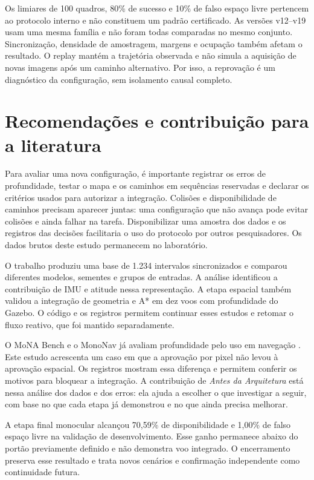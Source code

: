 Os limiares de 100 quadros, 80\% de sucesso e 10\% de falso espaço livre pertencem ao protocolo interno e não constituem um padrão certificado. As versões v12--v19 usam uma mesma família e não foram todas comparadas no mesmo conjunto. Sincronização, densidade de amostragem, margens e ocupação também afetam o resultado. O replay mantém a trajetória observada e não simula a aquisição de novas imagens após um caminho alternativo. Por isso, a reprovação é um diagnóstico da configuração, sem isolamento causal completo.

\section{Recomendações e contribuição para a literatura}

Para avaliar uma nova configuração, é importante registrar os erros de profundidade, testar o mapa e os caminhos em sequências reservadas e declarar os critérios usados para autorizar a integração. Colisões e disponibilidade de caminhos precisam aparecer juntas: uma configuração que não avança pode evitar colisões e ainda falhar na tarefa. Disponibilizar uma amostra dos dados e os registros das decisões facilitaria o uso do protocolo por outros pesquisadores. Os dados brutos deste estudo permanecem no laboratório.

O trabalho produziu uma base de 1.234 intervalos sincronizados e comparou diferentes modelos, sementes e grupos de entradas. A análise identificou a contribuição de IMU e atitude nessa representação. A etapa espacial também validou a integração de geometria e A* em dez voos com profundidade do Gazebo. O código e os registros permitem continuar esses estudos e retomar o fluxo reativo, que foi mantido separadamente.

O MoNA Bench e o MonoNav já avaliam profundidade pelo uso em navegação \cite{Pan2024MoNA,Simon2024MonoNav}. Este estudo acrescenta um caso em que a aprovação por pixel não levou à aprovação espacial. Os registros mostram essa diferença e permitem conferir os motivos para bloquear a integração. A contribuição de \textit{Antes da Arquitetura} está nessa análise dos dados e dos erros: ela ajuda a escolher o que investigar a seguir, com base no que cada etapa já demonstrou e no que ainda precisa melhorar.

A etapa final monocular alcançou 70,59\% de disponibilidade e 1,00\% de falso espaço livre na validação de desenvolvimento. Esse ganho permanece abaixo do portão previamente definido e não demonstra voo integrado. O encerramento preserva esse resultado e trata novos cenários e confirmação independente como continuidade futura.
